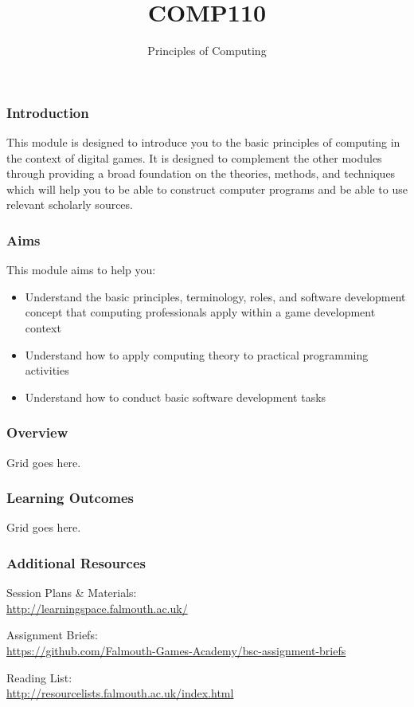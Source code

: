\documentclass[handout, xcolor={dvipsnames}]{beamer}\usepackage{etoolbox}\newtoggle{printable}\toggletrue{printable}
\begin{document}
\title{COMP110}
\subtitle{Principles of Computing}

\frame{\titlepage} 

\begin{frame}
	\frametitle{Introduction}
	This module is designed to introduce you to the basic principles of computing in the context of digital games. It is designed to complement the other modules through providing a broad foundation on the theories, methods, and techniques which will help you to be able to construct computer programs and be able to use relevant scholarly sources.
	
\end{frame}

\begin{frame}
	\frametitle{Aims}
	
	This module aims to help you:
	
	\begin{itemize}
		\item Understand the basic principles, terminology, roles, and software development concept that computing professionals apply within a game development context 
		\item Understand how to apply computing theory to practical programming activities
		\item Understand how to conduct basic software development tasks
	\end{itemize}
\end{frame}

\begin{frame}
	\frametitle{Overview}
	
	Grid goes here.
\end{frame}

\begin{frame}
	\frametitle{Learning Outcomes}
	
	Grid goes here.
\end{frame}

\begin{frame}
	\frametitle{Additional Resources}
	
	Session Plans \& Materials: \\
	\url{http://learningspace.falmouth.ac.uk/}
	
	\vspace{1.5em}	
	
	Assignment Briefs: \\
	\url{https://github.com/Falmouth-Games-Academy/bsc-assignment-briefs}

	\vspace{1.5em}	
	
	Reading List: \\
	\url{http://resourcelists.falmouth.ac.uk/index.html}

\end{frame}
\end{document}
